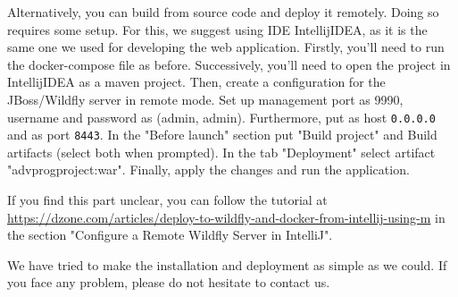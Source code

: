 Alternatively, you can build from source code and deploy it remotely. Doing so requires some setup. For this, we suggest using IDE IntellijIDEA, as it is the same one we used for developing the web application. Firstly, you'll need to run the docker-compose file as before. Successively, you'll need to open the project in IntellijIDEA as a maven project. Then, create a configuration for the JBoss/Wildfly server in remote mode. Set up management port as 9990, username and password as (admin, admin). Furthermore, put as host \texttt{0.0.0.0} and as port \texttt{8443}. In the "Before launch" section put "Build project" and Build artifacts (select both when prompted). In the tab "Deployment" select artifact "adv\textunderscore prog\textunderscore project:war". Finally, apply the changes and run the application. 

If you find this part unclear, you can follow the tutorial at \url{https://dzone.com/articles/deploy-to-wildfly-and-docker-from-intellij-using-m} in the section "Configure a Remote Wildfly Server in IntelliJ".

We have tried to make the installation and deployment as simple as we could. If you face any problem, please do not hesitate to contact us.